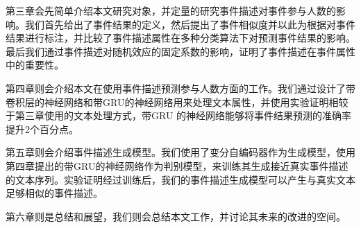 \documentclass[]{template}
\begin{document}
第三章会先简单介绍本文研究对象，并定量的研究事件描述对事件参与人数的影响。我们首先给出了事件结果的定义，然后提出了事件相似度并以此为根据对事件结果进行标注，并比较了事件描述属性在多种分类算法下对预测事件结果的影响。最后我们通过事件描述对随机效应的固定系数的影响，证明了事件描述在事件属性中的重要性。

第四章则会介绍本文在使用事件描述预测参与人数方面的工作。我们通过设计了带卷积层的神经网络和带GRU的神经网络用来处理文本属性，并使用实验证明相较于第三章使用的文本处理方式，带GRU 的神经网络能够将事件结果预测的准确率提升2个百分点。

第五章则会介绍事件描述生成模型。我们使用了变分自编码器作为生成模型，使用第四章提出的带GRU的神经网络作为判别模型，来训练其生成接近真实事件描述的文本序列。实验证明经过训练后，我们的事件描述生成模型可以产生与真实文本足够相似的事件描述。

第六章则是总结和展望，我们则会总结本文工作，并讨论其未来的改进的空间。
\end{document}
